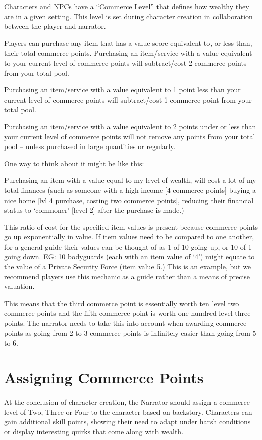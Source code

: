 Characters and NPCs have a “Commerce Level” that defines how wealthy they are in a given setting. This level is set during character creation in collaboration between the player and narrator.

Players can purchase any item that has a value score equivalent to, or less than, their total commerce points. Purchasing an item/service with a value equivalent to your current level of commerce points will subtract/cost 2 commerce points from your total pool.

Purchasing an item/service with a value equivalent to 1 point less than your current level of commerce points will subtract/cost 1 commerce point from your total pool.

Purchasing an item/service with a value equivalent to 2 points under or less than your current level of commerce points will not remove any points from your total pool – unless purchased in large quantities or regularly.

One way to think about it might be like this:

Purchasing an item with a value equal to my level of wealth, will cost a lot of my total finances (such as someone with a high income [4 commerce points] buying a nice home [lvl 4 purchase, costing two commerce points], reducing their financial status to ‘commoner’ [level 2] after the purchase is made.)

This ratio of cost for the specified item values is present because commerce points go up exponentially in value. If item values need to be compared to one another, for a general guide their values can be thought of as 1 of 10 going up, or 10 of 1 going down. EG: 10 bodyguards (each with an item value of ‘4’) might equate to the value of a Private Security Force (item value 5.) This is an example, but we recommend players use this mechanic as a guide rather than a means of precise valuation.

This means that the third commerce point is essentially worth ten level two commerce points and the fifth commerce point is worth one hundred level three points. The narrator needs to take this into account when awarding commerce points as going from 2 to 3 commerce points is infinitely easier than going from 5 to 6.

\section{Assigning Commerce Points} \label{sec:assigning_commerce_points}
At the conclusion of character creation, the Narrator should assign a commerce level of Two, Three or Four to the character based on backstory. Characters can gain additional skill points, showing their need to adapt under harsh conditions or display interesting quirks that come along with wealth.

